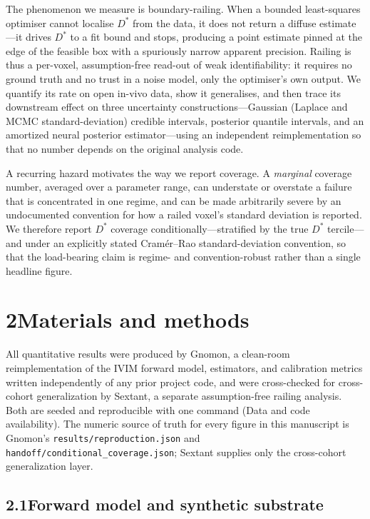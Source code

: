 \documentclass[11pt]{article}
\newcommand{\Dstar}{\ensuremath{D^{*}}}
\begin{document}
The phenomenon we measure is boundary-railing. When a bounded least-squares optimiser
cannot localise \Dstar{} from the data, it does not return a diffuse estimate---it drives
\Dstar{} to a fit bound and stops, producing a point estimate pinned at the edge of the
feasible box with a spuriously narrow apparent precision. Railing is thus a per-voxel,
assumption-free read-out of weak identifiability: it requires no ground truth and no
trust in a noise model, only the optimiser's own output. We quantify its rate on open
in-vivo data, show it generalises, and then trace its downstream effect on three
uncertainty constructions---Gaussian (Laplace and MCMC standard-deviation) credible
intervals, posterior quantile intervals, and an amortized neural posterior estimator---using
an independent reimplementation so that no number depends on the original analysis code.

A recurring hazard motivates the way we report coverage. A \emph{marginal} coverage
number, averaged over a parameter range, can understate or overstate a failure that is
concentrated in one regime, and can be made arbitrarily severe by an undocumented
convention for how a railed voxel's standard deviation is reported. We therefore report
\Dstar{} coverage conditionally---stratified by the true \Dstar{} tercile---and under an
explicitly stated Cram\'er--Rao standard-deviation convention, so that the load-bearing
claim is regime- and convention-robust rather than a single headline figure.

\section*{2\quad Materials and methods}

All quantitative results were produced by Gnomon, a clean-room reimplementation of the
IVIM forward model, estimators, and calibration metrics written independently of any
prior project code, and were cross-checked for cross-cohort generalization by Sextant, a
separate assumption-free railing analysis. Both are seeded and reproducible with one
command (Data and code availability). The numeric source of truth for every figure in
this manuscript is Gnomon's \texttt{results/reproduction.json} and
\texttt{handoff/conditional\_coverage.json}; Sextant supplies only the cross-cohort
generalization layer.

\subsection*{2.1\quad Forward model and synthetic substrate}
\end{document}
